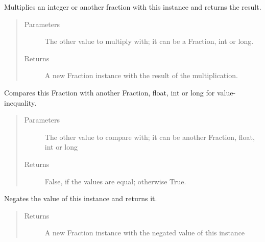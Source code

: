 \documentclass[letterpaper,10pt,english]{sphinxhowto}
\begin{document}
\begin{fulllineitems}
\begin{fulllineitems}
\label{\detokenize{fraction:fraction.Fraction.__mul__}}
Multiplies an integer or another fraction with this instance and returns the result.
\begin{quote}\begin{description}
\item[{Parameters}] \leavevmode
{} \textendash{} The other value to multiply with; it can be a Fraction, int or long.

\item[{Returns}] \leavevmode
A new Fraction instance with the result of the multiplication.

\end{description}\end{quote}

\end{fulllineitems}


\begin{fulllineitems}
\label{\detokenize{fraction:fraction.Fraction.__ne__}}
Compares this Fraction with another Fraction, float, int or long for value-inequality.
\begin{quote}\begin{description}
\item[{Parameters}] \leavevmode
{} \textendash{} The other value to compare with; it can be another Fraction, float, int or long

\item[{Returns}] \leavevmode
False, if the values are equal; otherwise True.

\end{description}\end{quote}

\end{fulllineitems}


\begin{fulllineitems}
\label{\detokenize{fraction:fraction.Fraction.__neg__}}
Negates the value of this instance and returns it.
\begin{quote}\begin{description}
\item[{Returns}] \leavevmode
A new Fraction instance with the negated value of this instance


\end{description}
\end{quote}
\end{fulllineitems}
\end{fulllineitems}
\end{document}
